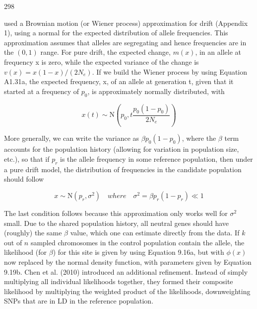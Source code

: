 \documentclass{article}
\begin{document}
298

used a Brownian motion (or Wiener process) approximation for drift (Appendix 1), using a normal for the expected distribution of allele frequencies. This approximation assumes that alleles are segregating and hence frequencies are in the  $ (0, 1) $ range. For pure drift, the expected change,  $ m(x) $, in an allele at frequency x is zero, while the expected variance of the change is  $ v(x) = x(1 - x)/(2N_e) $. If we build the Wiener process by using Equation A1.31a, the expected frequency, x, of an allele at generation t, given that it started at a frequency of  $ p_0 $, is approximately normally distributed, with

\begin{equation}
x(t)\sim\mathrm{N}\left(p_{0},t\frac{p_{0}(1-p_{0})}{2N_{e}}\right)
\tag{9.19a}
\label{eq:9_19a}
\end{equation}

More generally, we can write the variance as  $ \beta p_0(1 - p_0) $, where the  $ \beta $ term accounts for the population history (allowing for variation in population size, etc.), so that if  $ p_r $ is the allele frequency in some reference population, then under a pure drift model, the distribution of frequencies in the candidate population should follow

\begin{equation}
x\sim\mathrm{N}\left(p_{r},\sigma^{2}\right)\quad where\quad\sigma^{2}=\beta p_{r}(1-p_{r})\ll1
\tag{9.19b}
\label{eq:9_19b}
\end{equation}

The last condition follows because this approximation only works well for  $ \sigma^2 $ small. Due to the shared population history, all neutral genes should have (roughly) the same  $ \beta $ value, which one can estimate directly from the data. If  $ k $ out of  $ n $ sampled chromosomes in the control population contain the allele, the likelihood (for  $ \beta $) for this site is given by using Equation 9.16a, but with  $ \phi(x) $ now replaced by the normal density function, with parameters given by Equation 9.19b. Chen et al. (2010) introduced an additional refinement. Instead of simply multiplying all individual likelihoods together, they formed their composite likelihood by multiplying the weighted product of the likelihoods, downweighting SNPs that are in LD in the reference population.
\end{document}
